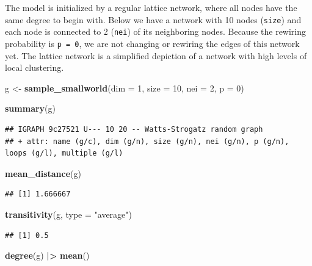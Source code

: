 \documentclass[
]{book}
\newenvironment{Shaded}{\begin{snugshade}}{\end{snugshade}}
\newcommand{\AttributeTok}[1]{\textcolor[rgb]{0.13,0.29,0.53}{#1}}
\newcommand{\DecValTok}[1]{\textcolor[rgb]{0.00,0.00,0.81}{#1}}
\newcommand{\FunctionTok}[1]{\textcolor[rgb]{0.13,0.29,0.53}{\textbf{#1}}}
\newcommand{\NormalTok}[1]{#1}
\newcommand{\OtherTok}[1]{\textcolor[rgb]{0.56,0.35,0.01}{#1}}
\newcommand{\SpecialCharTok}[1]{\textcolor[rgb]{0.81,0.36,0.00}{\textbf{#1}}}
\newcommand{\StringTok}[1]{\textcolor[rgb]{0.31,0.60,0.02}{#1}}
\begin{document}
The model is initialized by a regular lattice network, where all nodes have the same degree to begin with. Below we have a network with 10 nodes (\texttt{size}) and each node is connected to 2 (\texttt{nei}) of its neighboring nodes. Because the rewiring probability is \texttt{p\ =\ 0}, we are not changing or rewiring the edges of this network yet. The lattice network is a simplified depiction of a network with high levels of local clustering.

\begin{Shaded}
\begin{Highlighting}[]
\NormalTok{g }\OtherTok{\textless{}{-}} \FunctionTok{sample\_smallworld}\NormalTok{(}\AttributeTok{dim =} \DecValTok{1}\NormalTok{, }\AttributeTok{size =} \DecValTok{10}\NormalTok{, }\AttributeTok{nei =} \DecValTok{2}\NormalTok{, }\AttributeTok{p =} \DecValTok{0}\NormalTok{)}

\FunctionTok{summary}\NormalTok{(g)}
\end{Highlighting}
\end{Shaded}

\begin{verbatim}
## IGRAPH 9c27521 U--- 10 20 -- Watts-Strogatz random graph
## + attr: name (g/c), dim (g/n), size (g/n), nei (g/n), p (g/n), loops (g/l), multiple (g/l)
\end{verbatim}

\begin{Shaded}
\begin{Highlighting}[]
\FunctionTok{mean\_distance}\NormalTok{(g)}
\end{Highlighting}
\end{Shaded}

\begin{verbatim}
## [1] 1.666667
\end{verbatim}

\begin{Shaded}
\begin{Highlighting}[]
\FunctionTok{transitivity}\NormalTok{(g, }\AttributeTok{type =} \StringTok{"average"}\NormalTok{)}
\end{Highlighting}
\end{Shaded}

\begin{verbatim}
## [1] 0.5
\end{verbatim}

\begin{Shaded}
\begin{Highlighting}[]
\FunctionTok{degree}\NormalTok{(g) }\SpecialCharTok{|\textgreater{}} \FunctionTok{mean}\NormalTok{()}
\end{Highlighting}
\end{Shaded}
\end{document}
